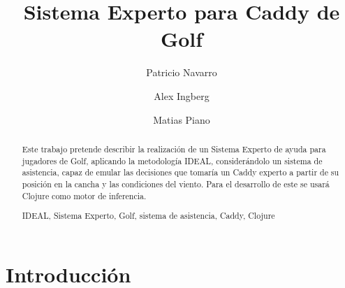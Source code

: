 \documentclass[runningheads,a4paper]{llncs}
\newcommand{\keywords}[1]{\par\addvspace\baselineskip
\noindent\keywordname\enspace\ignorespaces#1}
\begin{document}
\mainmatter  %

\title{Sistema Experto para Caddy de Golf}


%
%
\author{Patricio Navarro\and Alex Ingberg\and Matias Piano}
%


%
%

\maketitle


\begin{abstract}
Este trabajo pretende describir la realización de un Sistema Experto de ayuda para jugadores de Golf, aplicando la metodología IDEAL, considerándolo un sistema de asistencia, capaz de emular las decisiones que tomaría un Caddy experto a partir de su posición en la cancha  y las condiciones del viento. Para el desarrollo de este se usará Clojure como motor de inferencia.
\keywords{IDEAL, Sistema Experto, Golf, sistema de asistencia, Caddy, Clojure}
\end{abstract}


\section{Introducción}
\end{document}
